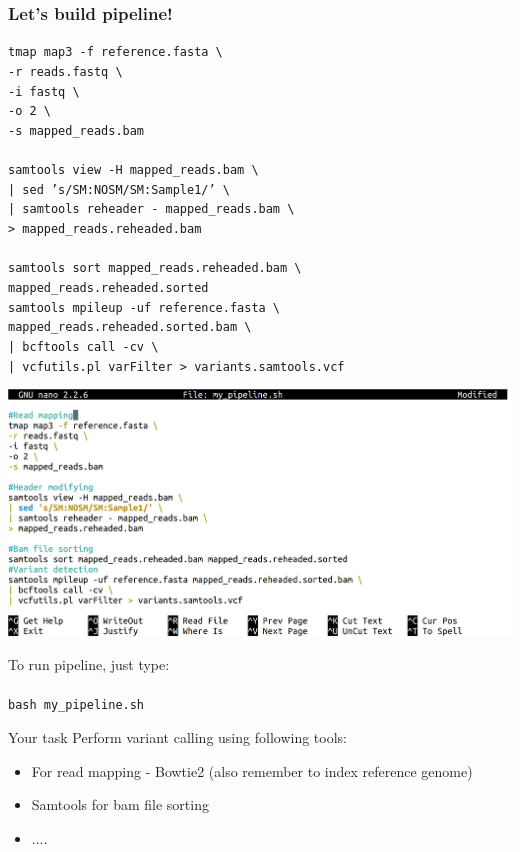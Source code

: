 \documentclass{beamer}
\newcommand{\tmap}[3]{\texttt{tmap map3 -f #1 \textbackslash \\
    -r #2 \textbackslash \\
    -i fastq \textbackslash \\
    -o 2 \textbackslash \\
    -s #3
  }
}
\newcommand{\sortbam}[2]{\texttt{samtools sort #1 \textbackslash \\ #2}}
\newcommand{\reheader}[2]{\texttt{samtools view -H #1 \textbackslash \\
    | sed 's/SM:NOSM/SM:Sample1/' \textbackslash \\
    | samtools reheader - mapped\_reads.bam \textbackslash \\
    > #2
  }
}
\newcommand{\samtoolssnp}[3]{\texttt{samtools mpileup -uf #1 \textbackslash \\
    #2 \textbackslash \\
    | bcftools call -cv \textbackslash \\
    | vcfutils.pl varFilter > #3
  }
}
\begin{document}
\begin{frame}
  \frametitle{Let's build pipeline!}
  \tmap{reference.fasta}{reads.fastq}{mapped\_reads.bam}\\~\\
  \reheader{mapped\_reads.bam}{mapped\_reads.reheaded.bam}\\~\\
  
  \sortbam{mapped\_reads.reheaded.bam}{mapped\_reads.reheaded.sorted}\\
  \samtoolssnp{reference.fasta}{mapped\_reads.reheaded.sorted.bam}{variants.samtools.vcf}
\end{frame}
  
\begin{frame}
  \begin{center}
    \includegraphics[width=\linewidth, keepaspectratio]{pic/mypipeline.png}
  \end{center}
\end{frame}

\begin{frame}
  \Huge To run pipeline, just type:\\~\\
  \texttt{bash my\_pipeline.sh}
\end{frame}

\begin{frame}{Your task}
Perform variant calling using following tools:
  \begin{itemize}
    \item For read mapping - Bowtie2 (also remember to index reference genome)
    \item Samtools for bam file sorting
    \item ....
  \end{itemize}
\end{frame}

\end{document}
